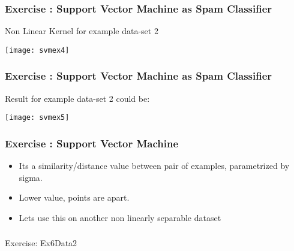 \begin{frame}[fragile]\frametitle{Exercise : Support Vector Machine as Spam Classifier}
Non Linear Kernel for example data-set 2
\begin{center}
\texttt{[image: svmex4]}
\end{center}
\end{frame}

\begin{frame}[fragile]\frametitle{Exercise : Support Vector Machine as Spam Classifier}
Result for example data-set 2 could be:
\begin{center}
\texttt{[image: svmex5]}
\end{center}
\end{frame}
%
%    
%
%
%
\begin{frame}[fragile]\frametitle{Exercise : Support Vector Machine}
\begin{itemize}
\item Its a similarity/distance value between pair of examples, parametrized by sigma.
\item Lower value, points are apart.
\item Lets use this on another non linearly separable dataset
\end{itemize}

\end{frame}

\begin{frame}[fragile]\frametitle{}
\begin{center}
{\Large Exercise: Ex6Data2}
\end{center}
\end{frame}

